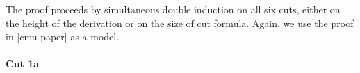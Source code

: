 





The proof proceeds by simultaneous double induction on all six cuts, either on
the height of the derivation or on the size of cut formula. Again, we use the
proof in [cmu paper] as a model.

\paragraph{Cut 1a}

